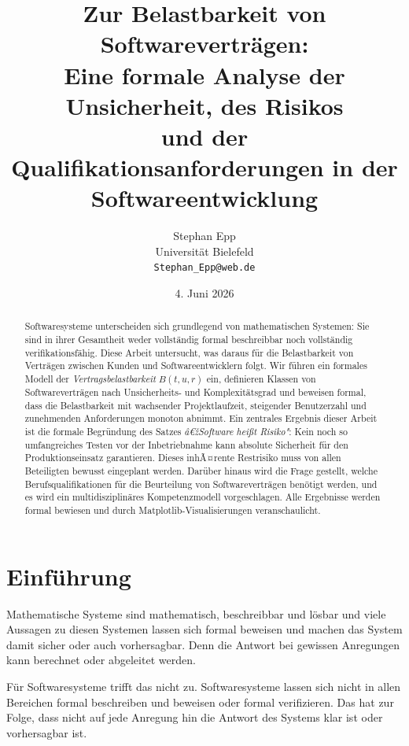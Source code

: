 ﻿\documentclass[a4paper,12pt]{article}
\title{Zur Belastbarkeit von Softwarevertr\"agen:\\
Eine formale Analyse der Unsicherheit, des Risikos\\
und der Qualifikationsanforderungen in der\\
Softwareentwicklung}
\author{Stephan Epp\\
\small Universit\"at Bielefeld\\
\small \texttt{Stephan\_Epp@web.de}}
\date{4. Juni 2026}
\theoremstyle{definition}
\begin{document}
\maketitle

\begin{abstract}
Softwaresysteme unterscheiden sich grundlegend von mathematischen Systemen: Sie sind in ihrer
Gesamtheit weder vollst\"andig formal beschreibbar noch vollst\"andig verifikationsf\"ahig.
Diese Arbeit untersucht, was daraus f\"ur die Belastbarkeit von Vertr\"agen zwischen Kunden
und Softwareentwicklern folgt. Wir f\"uhren ein formales Modell der \emph{Vertragsbelastbarkeit}
$B(t, u, r)$ ein, definieren Klassen von Softwarevertr\"agen nach Unsicherheits- und
Komplexit\"atsgrad und beweisen formal, dass die Belastbarkeit mit wachsender Projektlaufzeit,
steigender Benutzerzahl und zunehmenden Anforderungen monoton abnimmt. Ein zentrales Ergebnis
dieser Arbeit ist die formale Begr\"undung des Satzes \emph{â€žSoftware hei\ss{}t Risiko"}:
Kein noch so umfangreiches Testen vor der Inbetriebnahme kann absolute Sicherheit f\"ur den
Produktionseinsatz garantieren. Dieses inhÃ¤rente Restrisiko muss von allen Beteiligten
bewusst eingeplant werden. Dar\"uber hinaus wird die Frage gestellt, welche
Berufsqualifikationen f\"ur die Beurteilung von Softwarevertr\"agen ben\"otigt werden, und
es wird ein multidisziplin\"ares Kompetenzmodell vorgeschlagen. Alle Ergebnisse werden
formal bewiesen und durch Matplotlib-Visualisierungen veranschaulicht.
\end{abstract}

\tableofcontents
\newpage

\section{Einf\"uhrung}

Mathematische Systeme sind mathematisch, beschreibbar und l\"osbar und viele Aussagen zu
diesen Systemen lassen sich formal beweisen und machen das System damit sicher oder auch
vorhersagbar. Denn die Antwort bei gewissen Anregungen kann berechnet oder abgeleitet werden.

F\"ur Softwaresysteme trifft das nicht zu. Softwaresysteme lassen sich nicht in allen
Bereichen formal beschreiben und beweisen oder formal verifizieren. Das hat zur Folge, dass
nicht auf jede Anregung hin die Antwort des Systems klar ist oder vorhersagbar ist.
\end{document}
